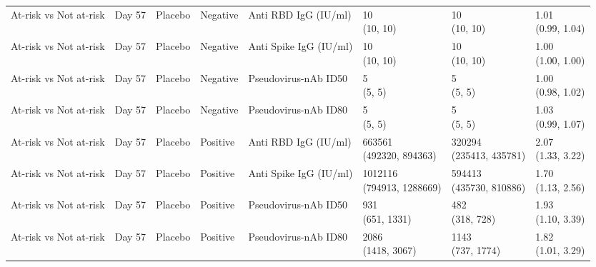 \documentclass[]{book}
\theoremstyle{definition}
\theoremstyle{definition}
\theoremstyle{definition}
\newcommand{\1}{\mathbbm{1}}
\begin{document}
\begin{landscape}
\begin{ThreePartTable}
\begin{longtable}[t]{>{\raggedright\arraybackslash}p{2.7cm}lllllll}
At-risk vs Not at-risk & Day 57 & Placebo & Negative & Anti RBD IgG (IU/ml) & \makecell[l]{10\\(10, 10)} & \makecell[l]{10\\(10, 10)} & \makecell[l]{1.01\\(0.99, 1.04)}\\
At-risk vs Not at-risk & Day 57 & Placebo & Negative & Anti Spike IgG (IU/ml) & \makecell[l]{10\\(10, 10)} & \makecell[l]{10\\(10, 10)} & \makecell[l]{1.00\\(1.00, 1.00)}\\
\addlinespace
At-risk vs Not at-risk & Day 57 & Placebo & Negative & Pseudovirus-nAb ID50 & \makecell[l]{5\\(5, 5)} & \makecell[l]{5\\(5, 5)} & \makecell[l]{1.00\\(0.98, 1.02)}\\
At-risk vs Not at-risk & Day 57 & Placebo & Negative & Pseudovirus-nAb ID80 & \makecell[l]{5\\(5, 5)} & \makecell[l]{5\\(5, 5)} & \makecell[l]{1.03\\(0.99, 1.07)}\\
At-risk vs Not at-risk & Day 57 & Placebo & Positive & Anti RBD IgG (IU/ml) & \makecell[l]{663561\\(492320, 894363)} & \makecell[l]{320294\\(235413, 435781)} & \makecell[l]{2.07\\(1.33, 3.22)}\\
At-risk vs Not at-risk & Day 57 & Placebo & Positive & Anti Spike IgG (IU/ml) & \makecell[l]{1012116\\(794913, 1288669)} & \makecell[l]{594413\\(435730, 810886)} & \makecell[l]{1.70\\(1.13, 2.56)}\\
At-risk vs Not at-risk & Day 57 & Placebo & Positive & Pseudovirus-nAb ID50 & \makecell[l]{931\\(651, 1331)} & \makecell[l]{482\\(318, 728)} & \makecell[l]{1.93\\(1.10, 3.39)}\\
\addlinespace
At-risk vs Not at-risk & Day 57 & Placebo & Positive & Pseudovirus-nAb ID80 & \makecell[l]{2086\\(1418, 3067)} & \makecell[l]{1143\\(737, 1774)} & \makecell[l]{1.82\\(1.01, 3.29)}\\

\end{longtable}
\end{ThreePartTable}
\end{landscape}
\end{document}
